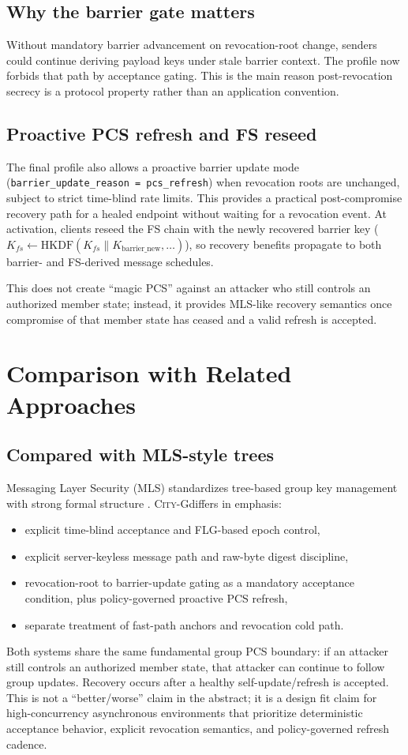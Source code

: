 \documentclass[11pt]{article}
\newcommand{\cityg}{\textsc{City-G}}
\begin{document}
\subsection{Why the barrier gate matters}
Without mandatory barrier advancement on revocation-root change, senders could continue deriving payload keys under stale barrier context. The profile now forbids that path by acceptance gating. This is the main reason post-revocation secrecy is a protocol property rather than an application convention.

\subsection{Proactive PCS refresh and FS reseed}
The final profile also allows a proactive barrier update mode (\texttt{barrier\_update\_reason = pcs\_refresh}) when revocation roots are unchanged, subject to strict time-blind rate limits. This provides a practical post-compromise recovery path for a healed endpoint without waiting for a revocation event. At activation, clients reseed the FS chain with the newly recovered barrier key (\(K_{fs} \leftarrow \mathrm{HKDF}(K_{fs}\|K_{\mathrm{barrier\_new}}, \ldots)\)), so recovery benefits propagate to both barrier- and FS-derived message schedules.

This does not create ``magic PCS'' against an attacker who still controls an authorized member state; instead, it provides MLS-like recovery semantics once compromise of that member state has ceased and a valid refresh is accepted.

\section{Comparison with Related Approaches}
\subsection{Compared with MLS-style trees}
Messaging Layer Security (MLS) standardizes tree-based group key management with strong formal structure \citep{rfc9420}. \cityg differs in emphasis:
\begin{itemize}
  \item explicit time-blind acceptance and FLG-based epoch control,
  \item explicit server-keyless message path and raw-byte digest discipline,
  \item revocation-root to barrier-update gating as a mandatory acceptance condition, plus policy-governed proactive PCS refresh,
  \item separate treatment of fast-path anchors and revocation cold path.
\end{itemize}
Both systems share the same fundamental group PCS boundary: if an attacker still controls an authorized member state, that attacker can continue to follow group updates. Recovery occurs after a healthy self-update/refresh is accepted. This is not a ``better/worse'' claim in the abstract; it is a design fit claim for high-concurrency asynchronous environments that prioritize deterministic acceptance behavior, explicit revocation semantics, and policy-governed refresh cadence.
\end{document}
